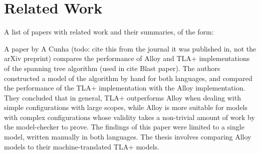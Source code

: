 \chapter{Related Work}


A list of papers with related work and their summaries, of the form:





A paper by A Cunha (todo: cite this from the journal it was published in, not the arXiv preprint) compares the performance of Alloy and TLA+ implementations of the spanning tree algorithm (used in cite Blast paper). The authors constructed a model of the algorithm by hand for both languages, and compared the performance of the TLA+ implementation with the Alloy implementation. They concluded that in general, TLA+ outperforms Alloy when dealing with simple configurations with large scopes, while Alloy is more suitable for models with complex configurations whose validity takes a non-trivial amount of work by the model-checker to prove. The findings of this paper were limited to a single model, written manually in both languages. The thesis involves comparing Alloy models to their machine-translated TLA+ models.
